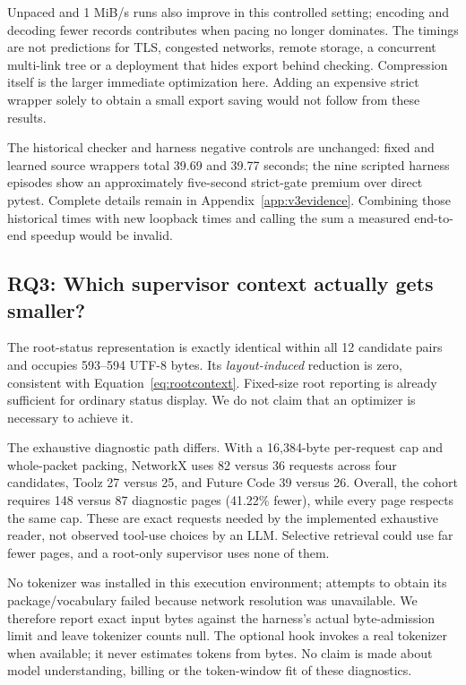Unpaced and 1 MiB/s runs also improve in this controlled setting; encoding and decoding fewer records contributes when pacing no longer dominates. The timings are not predictions for TLS, congested networks, remote storage, a concurrent multi-link tree or a deployment that hides export behind checking. Compression itself is the larger immediate optimization here. Adding an expensive strict wrapper solely to obtain a small export saving would not follow from these results.

The historical checker and harness negative controls are unchanged: fixed and learned source wrappers total 39.69 and 39.77 seconds; the nine scripted harness episodes show an approximately five-second strict-gate premium over direct pytest. Complete details remain in Appendix~\ref{app:v3evidence}. Combining those historical times with new loopback times and calling the sum a measured end-to-end speedup would be invalid.

\subsection{RQ3: Which supervisor context actually gets smaller?}
The root-status representation is exactly identical within all 12 candidate pairs and occupies 593--594 UTF-8 bytes. Its \emph{layout-induced} reduction is zero, consistent with Equation~\eqref{eq:rootcontext}. Fixed-size root reporting is already sufficient for ordinary status display. We do not claim that an optimizer is necessary to achieve it.

The exhaustive diagnostic path differs. With a 16,384-byte per-request cap and whole-packet packing, NetworkX uses 82 versus 36 requests across four candidates, Toolz 27 versus 25, and Future Code 39 versus 26. Overall, the cohort requires 148 versus 87 diagnostic pages (41.22\% fewer), while every page respects the same cap. These are exact requests needed by the implemented exhaustive reader, not observed tool-use choices by an LLM. Selective retrieval could use far fewer pages, and a root-only supervisor uses none of them.

No tokenizer was installed in this execution environment; attempts to obtain its package/vocabulary failed because network resolution was unavailable. We therefore report exact input bytes against the harness's actual byte-admission limit and leave tokenizer counts null. The optional hook invokes a real tokenizer~\cite{tiktoken} when available; it never estimates tokens from bytes. No claim is made about model understanding, billing or the token-window fit of these diagnostics.

